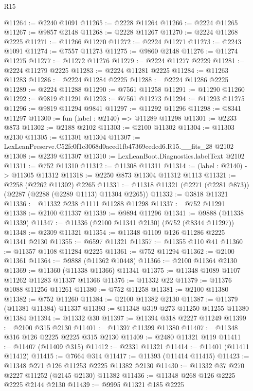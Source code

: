 \begin{lexlean}{R15}
\begin{coremodule}
@11264 := @2240 @1091
@11265 := @2228 @11264
@11266 := @2224 @11265
@11267 := @9857 @2148
@11268 := @2228 @11267
@11270 := @2224 @11268 @2225
@11271 := @11266 @11270
@11272 := @2224 @11271
@11273 := @2243 @1091
@11274 := @7557 @11273
@11275 := @9860 @2148
@11276 := @11274 @11275
@11277 := @11272 @11276
@11279 := @2224 @11277 @2229
@11281 := @2224 @11279 @2225
@11283 := @2224 @11281 @2225
@11284 := @11263 @11283
@11286 := @2224 @11284 @2225
@11288 := @2224 @11286 @2225
@11289 := @2224 @11288
@11290 := @7561 @11258
@11291 := @11290 @11260
@11292 := @9819 @11291
@11293 := @7561 @11273
@11294 := @11293 @11275
@11296 := @9819 @11294 @9841
@11297 := @11292 @11296
@11298 := @8341 @11297
@11300 := fun (label : @2140) => @11289 @11298
@11301 := @2233 @873
@11302 := @2188 @2102
@11303 := @2100 @11302
@11304 := @11303 @2130
@11305 := @11301 @11304
@11307 := LexLeanPreserve.C52fc0f1c3068d0aced1fb47369ccdcd6.R15.__fits_28 @2102
@11308 := @2239 @11307
@11310 := LexLeanBoot.Diagnostics.labelText @2102
@11311 := @752 @11310
@11312 := @11308 @11311
@11314 := (label : @2140) -> @11305 @11312
@11318 := @2250 @873 @11304 @11312 @1113
@11321 := @2258 (@2262 @11302) @2265
@11331 := @11318 @11321 (@2271 (@2281 @873)) (@2287 (@2288 (@2289 @1113) @11304 @2265))
@11332 := @3818 @11321
@11336 := @11332 @238 @1111 @11288 @11298
@11337 := @752 @11291
@11338 := @2100 @11337
@11339 := @9894 @11296
@11341 := @9888 (@11338 @11339)
@11347 := @11336 (@2100 @11341 @2130) (@752 (@8344 @11297))
@11348 := @2309 @11321
@11354 := @11348 @1109 @126 @11286 @2225 @11341 @2130
@11355 := @6597 @11321
@11357 := @11355 @110 @41
@11360 := @11357 @1108 @11284 @2225
@11361 := @752 @11294
@11362 := @2100 @11361
@11364 := @9888 (@11362 @10448)
@11366 := @2100 @11364 @2130
@11369 := @11360 (@11338 @11366) @11341
@11375 := @11348 @1089 @1107 @11262 @11283 @11337 @11366
@11376 := @11332 @22
@11379 := @11376 @1088 @11256 @11261
@11380 := @752 @11258
@11381 := @2100 @11380
@11382 := @752 @11260
@11384 := @2100 @11382 @2130
@11387 := @11379 (@11381 @11384) @11337
@11393 := @11348 @319 @273 @11250 @11255 @11380 @11384
@11394 := @11332 @30
@11397 := @11394 @318 @2227 @11249
@11399 := @2100 @315 @2130
@11401 := @11397 @11399 @11380
@11407 := @11348 @316 @126 @2225 @2225 @315 @2130
@11409 := @2480 @11321 @119
@11411 := @11407 (@11409 @315)
@11412 := @2331 @11321
@11414 := @11401 (@11411 @11412)
@11415 := @7664 @314
@11417 := @11393 (@11414 @11415)
@11423 := @11348 @271 @126 @11253 @2225 @11382 @2130
@11430 := @11332 @37 @270 @2227 @11252 (@2145 @2130) @11382
@11436 := @11348 @268 @126 @2225 @2225 @2144 @2130
@11439 := @9995 @11321 @185 @2225

\end{coremodule}
\end{lexlean}
